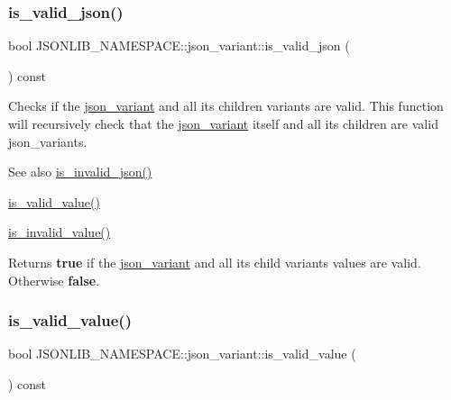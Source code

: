 \subsubsection{\texorpdfstring{is\+\_\+valid\+\_\+json()}{is\_valid\_json()}\hspace{0.1cm}{\footnotesize\ttfamily [2/2]}}
{\footnotesize\ttfamily bool J\+S\+O\+N\+L\+I\+B\+\_\+\+N\+A\+M\+E\+S\+P\+A\+C\+E\+::json\+\_\+variant\+::is\+\_\+valid\+\_\+json (\begin{DoxyParamCaption}{ }\end{DoxyParamCaption}) const}



Checks if the \hyperlink{classJSONLIB__NAMESPACE_1_1json__variant}{json\+\_\+variant} and all its children variants are valid. This function will recursively check that the \hyperlink{classJSONLIB__NAMESPACE_1_1json__variant}{json\+\_\+variant} itself and all its children are valid json\+\_\+variants. 

\begin{DoxySeeAlso}{See also}
\hyperlink{classJSONLIB__NAMESPACE_1_1json__variant_a1a08b35da4cf3a334d32ebb81b20c08a}{is\+\_\+invalid\+\_\+json()} 

\hyperlink{classJSONLIB__NAMESPACE_1_1json__variant_a224aab2dd56e3928dd893be8b7f3367a}{is\+\_\+valid\+\_\+value()} 

\hyperlink{classJSONLIB__NAMESPACE_1_1json__variant_ab6552a5e3de90ab1fbca078e5c245bfb}{is\+\_\+invalid\+\_\+value()} 
\end{DoxySeeAlso}
\begin{DoxyReturn}{Returns}
{\bfseries true} if the \hyperlink{classJSONLIB__NAMESPACE_1_1json__variant}{json\+\_\+variant} and all its child variants values are valid. Otherwise {\bfseries false}. 
\end{DoxyReturn}
\mbox{\label{classJSONLIB__NAMESPACE_1_1json__variant_a224aab2dd56e3928dd893be8b7f3367a}} 
\subsubsection{\texorpdfstring{is\+\_\+valid\+\_\+value()}{is\_valid\_value()}\hspace{0.1cm}{\footnotesize\ttfamily [1/2]}}
{\footnotesize\ttfamily bool J\+S\+O\+N\+L\+I\+B\+\_\+\+N\+A\+M\+E\+S\+P\+A\+C\+E\+::json\+\_\+variant\+::is\+\_\+valid\+\_\+value (\begin{DoxyParamCaption}{ }\end{DoxyParamCaption}) const}



